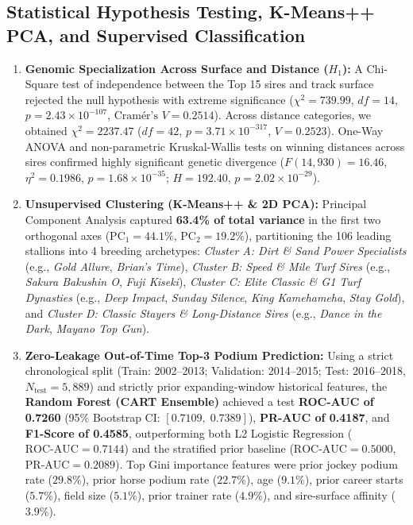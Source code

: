 \documentclass[12pt,a4paper]{article}
\begin{document}
\subsection{Statistical Hypothesis Testing, K-Means++ PCA, and Supervised Classification}
\begin{enumerate}
    \item \textbf{Genomic Specialization Across Surface and Distance ($H_1$):} A Chi-Square test of independence between the Top 15 sires and track surface rejected the null hypothesis with extreme significance ($\chi^2 = 739.99$, $df = 14$, $p = 2.43 \times 10^{-107}$, $\text{Cramér's } V = 0.2514$). Across distance categories, we obtained $\chi^2 = 2237.47$ ($df = 42$, $p = 3.71 \times 10^{-317}$, $V = 0.2523$). One-Way ANOVA and non-parametric Kruskal-Wallis tests on winning distances across sires confirmed highly significant genetic divergence ($F(14, 930) = 16.46$, $\eta^2 = 0.1986$, $p = 1.68 \times 10^{-35}$; $H = 192.40$, $p = 2.02 \times 10^{-29}$).
    \item \textbf{Unsupervised Clustering (K-Means++ \& 2D PCA):} Principal Component Analysis captured \textbf{63.4\% of total variance} in the first two orthogonal axes ($\text{PC}_1 = 44.1\%$, $\text{PC}_2 = 19.2\%$), partitioning the 106 leading stallions into 4 breeding archetypes: \textit{Cluster A: Dirt \& Sand Power Specialists} (e.g., \textit{Gold Allure}, \textit{Brian's Time}), \textit{Cluster B: Speed \& Mile Turf Sires} (e.g., \textit{Sakura Bakushin O}, \textit{Fuji Kiseki}), \textit{Cluster C: Elite Classic \& G1 Turf Dynasties} (e.g., \textit{Deep Impact}, \textit{Sunday Silence}, \textit{King Kamehameha}, \textit{Stay Gold}), and \textit{Cluster D: Classic Stayers \& Long-Distance Sires} (e.g., \textit{Dance in the Dark}, \textit{Mayano Top Gun}).
    \item \textbf{Zero-Leakage Out-of-Time Top-3 Podium Prediction:} Using a strict chronological split (Train: 2002--2013; Validation: 2014--2015; Test: 2016--2018, $N_{\text{test}} = 5,889$) and strictly prior expanding-window historical features, the \textbf{Random Forest (CART Ensemble)} achieved a test \textbf{ROC-AUC of 0.7260} (95\% Bootstrap CI: $[0.7109,\; 0.7389]$), \textbf{PR-AUC of 0.4187}, and \textbf{F1-Score of 0.4585}, outperforming both L2 Logistic Regression ($\text{ROC-AUC} = 0.7144$) and the stratified prior baseline ($\text{ROC-AUC} = 0.5000$, $\text{PR-AUC} = 0.2089$). Top Gini importance features were prior jockey podium rate ($29.8\%$), prior horse podium rate ($22.7\%$), age ($9.1\%$), prior career starts ($5.7\%$), field size ($5.1\%$), prior trainer rate ($4.9\%$), and sire-surface affinity ($3.9\%$).
\end{enumerate}
\end{document}
